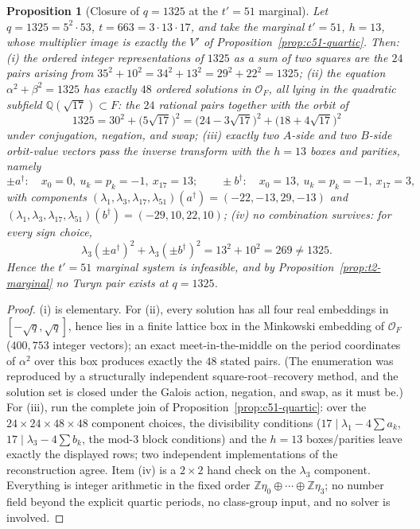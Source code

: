\documentclass[11pt]{article}
\theoremstyle{plain}
\newtheorem{proposition}[theorem]{Proposition}
\theoremstyle{definition}
\theoremstyle{remark}
\newcommand{\Z}{\mathbb Z}
\newcommand{\Q}{\mathbb Q}
\begin{document}
\begin{proposition}[Closure of $q=1325$ at the $t'=51$ marginal]\label{prop:q1325-quartic}
Let $q=1325=5^2\cdot53$, $t=663=3\cdot13\cdot17$, and take the marginal
$t'=51$, $h=13$, whose multiplier image is exactly the $V'$ of
Proposition~\ref{prop:c51-quartic}. Then:
\emph{(i)} the ordered integer representations of $1325$ as a sum of two
squares are the $24$ pairs arising from
$35^2+10^2=34^2+13^2=29^2+22^2=1325$;
\emph{(ii)} the equation $\alpha^2+\beta^2=1325$ has exactly $48$ ordered
solutions in $\mathcal O_F$, all lying in the quadratic subfield
$\Q(\sqrt{17})\subset F$: the $24$ rational pairs together with the orbit of
\[
  1325=30^2+\bigl(5\sqrt{17}\bigr)^2
      =\bigl(24-3\sqrt{17}\bigr)^2+\bigl(18+4\sqrt{17}\bigr)^2
\]
under conjugation, negation, and swap;
\emph{(iii)} exactly two $A$-side and two $B$-side orbit-value vectors pass
the inverse transform with the $h=13$ boxes and parities, namely
\[
  \pm a^\dagger:\quad x_0=0,\ u_k=p_k=-1,\ x_{17}=13;\qquad
  \pm b^\dagger:\quad x_0=13,\ u_k=p_k=-1,\ x_{17}=3,
\]
with components
$(\lambda_1,\lambda_3,\lambda_{17},\lambda_{51})(a^\dagger)=(-22,-13,29,-13)$
and $(\lambda_1,\lambda_3,\lambda_{17},\lambda_{51})(b^\dagger)=(-29,10,22,10)$;
\emph{(iv)} no combination survives: for every sign choice,
\[
  \lambda_3(\pm a^\dagger)^2+\lambda_3(\pm b^\dagger)^2=13^2+10^2=269\ne1325 .
\]
Hence the $t'=51$ marginal system is infeasible, and by
Proposition~\ref{prop:t2-marginal} no Turyn pair exists at $q=1325$.
\end{proposition}

\begin{proof}
(i) is elementary. For (ii), every solution has all four real embeddings in
$[-\sqrt q,\sqrt q]$, hence lies in a finite lattice box in the Minkowski
embedding of $\mathcal O_F$ ($400{,}753$ integer vectors); an exact
meet-in-the-middle on the period coordinates of $\alpha^2$ over this box
produces exactly the $48$ stated pairs. (The enumeration was reproduced by a
structurally independent square-root--recovery method, and the solution set is
closed under the Galois action, negation, and swap, as it must be.) For (iii),
run the complete join of Proposition~\ref{prop:c51-quartic}: over the
$24\times24\times48\times48$ component choices, the divisibility conditions
($17\mid\lambda_1-4\sum a_k$, $17\mid\lambda_3-4\sum b_k$, the mod-$3$ block
conditions) and the $h=13$ boxes/parities leave exactly the displayed rows;
two independent implementations of the reconstruction agree. Item (iv) is a
$2\times2$ hand check on the $\lambda_3$ component. Everything is integer
arithmetic in the fixed order $\Z\eta_0\oplus\cdots\oplus\Z\eta_3$; no number
field beyond the explicit quartic periods, no class-group input, and no solver
is involved.
\end{proof}
\end{document}
